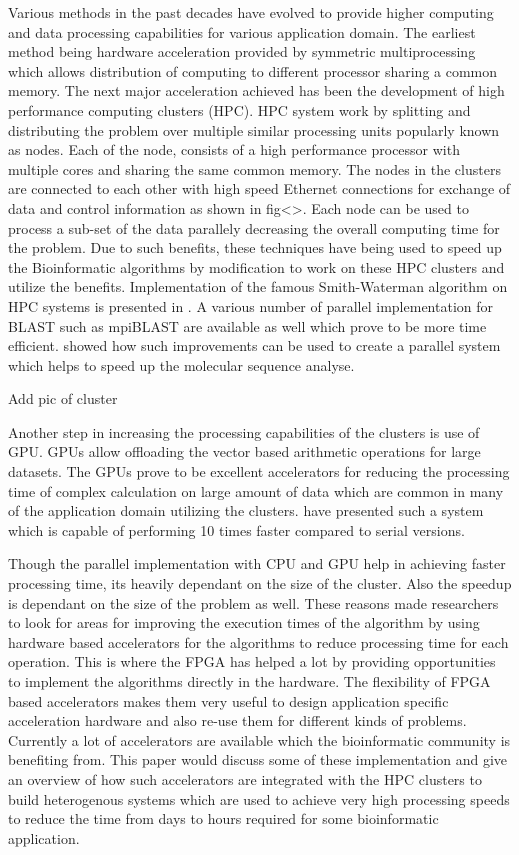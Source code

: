 \documentclass[12pt,twoside]{article}
\begin{document}
Various methods in the past decades have evolved to provide higher computing and data processing capabilities for various application domain.
The earliest method being hardware acceleration provided by symmetric multiprocessing which allows distribution of computing to different processor
sharing a common memory. The next major acceleration achieved has been the development of high performance computing clusters (HPC).  HPC
system work by splitting and distributing the problem over multiple similar processing units popularly known as nodes. Each of the node,
consists of a high performance processor with multiple cores and sharing the same common memory. The nodes in the clusters are connected to
each other with high speed Ethernet connections for exchange of data and control information as shown in fig<>. Each node can be used to
process a sub-set of the data parallely decreasing the overall computing time for the problem. Due to such benefits, these techniques have
being used to speed up the Bioinformatic algorithms by modification to work on these HPC clusters and utilize the benefits.
Implementation of the famous Smith-Waterman algorithm on HPC systems is presented in \cite{boukerche_parallel_2005,martins_multithreaded_2000}.
A various number of parallel implementation for BLAST such as mpiBLAST \cite{darling_design_2003} are available as well which prove
to be more time efficient. \textcite{schmidt_massively_2002} showed how such improvements can be used to create a parallel system which
helps to speed up the molecular sequence analyse.

{Add pic of cluster} 

Another step in increasing the processing capabilities of the clusters is use of GPU. GPUs allow offloading
the vector based arithmetic operations for large datasets. The GPUs prove to be excellent accelerators for reducing
the processing time of complex calculation on large amount of data which are common in many of the application domain
utilizing the clusters. \textcite{liu_cuda-blastp:_2011} have presented such a system which is capable of performing
10 times faster compared to serial versions.

Though the parallel implementation with CPU and GPU help in achieving faster processing time, its heavily dependant
on the size of the cluster. Also the speedup is dependant on the size of the problem as well. These reasons
made researchers to look for areas for improving the execution times of the algorithm by using hardware based
accelerators for the algorithms to reduce processing time for each operation. This is where the FPGA has 
helped a lot by providing opportunities to implement the algorithms directly in the hardware. The flexibility
of FPGA based accelerators makes them very useful to design application specific acceleration hardware and
also re-use them for different kinds of problems. Currently a lot of accelerators are available which the bioinformatic
community is benefiting from. This paper would discuss some of these implementation and give an overview of how
such accelerators are integrated with the HPC clusters to build heterogenous systems which are used to
achieve very high processing speeds to reduce the time from days to hours required for some bioinformatic application.
\end{document}
